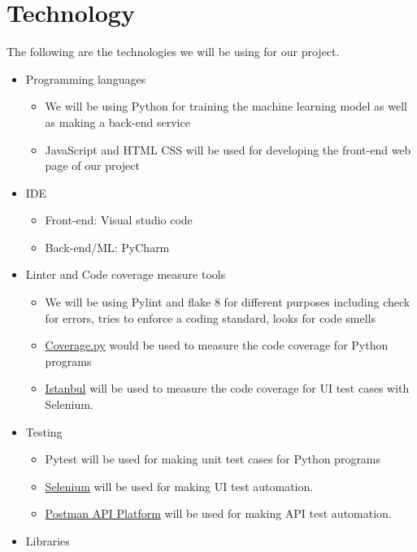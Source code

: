 \documentclass[12pt,letterpaper]{article}
\begin{document}
\section{Technology}
The following are the technologies we will be using for our project.
\begin{itemize}
    \item Programming languages
    \begin{itemize}
        \item We will be using Python for training the machine learning model as
        well as making a back-end service 
        \item JavaScript and HTML CSS will be used for developing the front-end
        web page of our project
    \end{itemize}
    \item IDE
    \begin{itemize}
        \item Front-end: Visual studio code
        \item Back-end/ML: PyCharm
    \end{itemize}
    \item Linter and Code coverage measure tools
    \begin{itemize}
        \item We will be using Pylint and flake 8 for different purposes
        including check for errors, tries to enforce a coding standard, looks
        for code smells
        \item \href{https://coverage.readthedocs.io/en/6.5.0/}{Coverage.py}
        would be used to measure the code coverage for Python programs
        \item \href{https://istanbul.js.org/}{Istanbul} will be used to measure
        the code coverage for UI test cases with Selenium.
    \end{itemize}
    \item Testing
    \begin{itemize}
        \item Pytest will be used for making unit test cases for Python programs
        \item \href{https://www.selenium.dev/}{Selenium} will be used for making
        UI test automation.
        \item \href{https://www.postman.com/}{Postman API Platform} will be used
        for making API test automation.
    \end{itemize}
    \item Libraries
    \begin{itemize}

\end{itemize}
\end{itemize}
\end{document}
